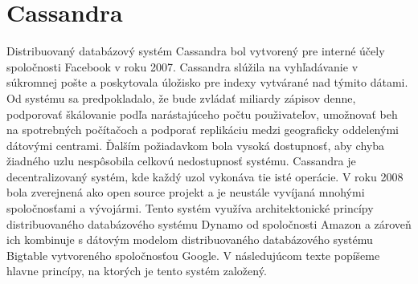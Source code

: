 \documentclass[11pt,twoside,a4paper]{book}
\begin{document}




\chapter{Cassandra}


Distribuovaný databázový systém Cassandra bol vytvorený pre interné účely spoločnosti Facebook v roku 2007. Cassandra slúžila na vyhľadávanie v súkromnej pošte a poskytovala úložisko pre indexy vytvárané nad týmito dátami. Od systému sa predpokladalo, že bude zvládať miliardy zápisov denne, podporovať škálovanie podľa narástajúceho počtu použivateľov, umožnovať beh na spotrebných počítačoch a podporať replikáciu medzi geograficky oddelenými dátovými centrami. Ďalším požiadavkom bola vysoká dostupnosť, aby chyba žiadného uzlu nespôsobila celkovú nedostupnosť systému. Cassandra je decentralizovaný systém, kde každý uzol vykonáva tie isté operácie. V roku 2008 bola zverejnená ako open source projekt a je neustále vyvíjaná mnohými spoločnosťami a vývojármi. Tento systém využíva architektonické princípy distribuovaného databázového systému Dynamo od spoločnosti Amazon a zároveň ich kombinuje s dátovým modelom distribuovaného databázového systému Bigtable vytvoreného spoločnosťou Google. V následujúcom texte popíšeme hlavne princípy, na ktorých je tento systém založený.
\end{document}
